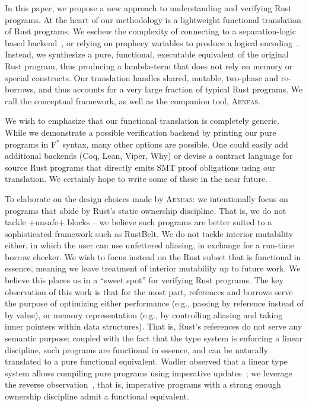 \documentclass[acmsmall,screen]{acmart}
\newcommand{\aeneas}{\textsc{Aeneas}\xspace}
\newcommand{\fstar}{F$^\ast$\xspace}
\begin{document}
In this paper, we propose a new approach to understanding and verifying Rust
programs. At the heart of our methodology is a lightweight functional
translation of Rust programs. We eschew the complexity of connecting to a
separation-logic based backend~\cite{jung2017rustbelt}, or relying on prophecy
variables to produce a logical
encoding~\cite{RustHornBelt, matsushita2020rusthorn}.
Instead, we synthesize a pure, functional, executable
equivalent of the original Rust program, thus producing a lambda-term that does
not rely on memory or special constructs. Our translation handles shared, mutable, two-phase and
re-borrows, and thus accounts for a very large fraction of typical Rust
programs.
We call the conceptual framework, as well as the companion tool, \aeneas.

We wish to emphasize that our functional translation is completely generic.
While we demonstrate a possible verification backend by printing our pure
programs in \fstar syntax, many other options are possible.  One could easily
add additional backends (Coq, Lean, Viper, Why) or devise a contract language
for source Rust programs that directly emits SMT proof obligations using our
translation. We certainly hope to write some of these in the near future.


To elaborate on the design choices made by \aeneas:
we intentionally focus on programs that
abide by Rust's static ownership discipline. That is, we do not tackle
\li+unsafe+ blocks -- we believe such programs are better suited to a
sophisticated framework such as RustBelt. We do not tackle interior mutability
either, in which the user can use unfettered aliasing, in exchange for a
run-time borrow checker.  We wish to focus instead on the Rust subset that
is functional in essence, meaning we leave treatment of interior mutability up
to future work. We believe this places us in a ``sweet spot'' for
verifying Rust programs.
The key observation of this work is that for the most part, references and borrows serve the
purpose of optimizing either performance (e.g., passing by reference instead
of by value), or memory representation (e.g., by controlling aliasing and taking
inner pointers within data structures).
That is, Rust's references do not serve
any semantic purpose; coupled with the fact that the type
system is
enforcing a linear discipline, such programs are functional in essence, and can be naturally translated to a pure
functional equivalent. Wadler observed that a linear type system allows
compiling pure programs using imperative updates~\cite{wadler1990linear}; we
leverage the reverse observation~\cite{chargueraud2008functional}, that is,
imperative programs with a strong enough ownership discipline admit
a functional equivalent.
\end{document}
